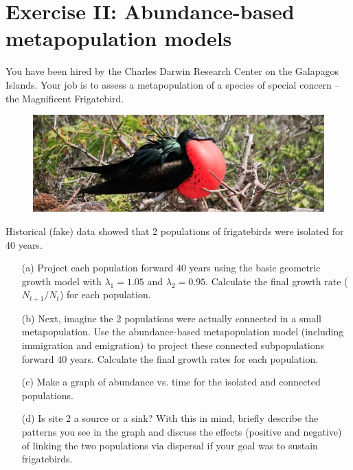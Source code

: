 \documentclass[12pt]{article}\usepackage[]{graphicx}\usepackage[]{xcolor}
\begin{document}
\clearpage


\section*{Exercise II: Abundance-based metapopulation models }
You have been hired by the Charles Darwin Research Center on the
Galapagos Islands. Your job is to assess a metapopulation of a species
of special concern -- the Magnificent Frigatebird.

\begin{figure}[h!]
  \centering
  \includegraphics[width=\textwidth]{figs/frigatebird}
  \label{fig:frig}
\end{figure}

\vspace{-24pt}

Historical (fake) data showed that 2 populations of frigatebirds were
isolated for 40 years.

\begin{enumerate}
  \item[(a)] Project each population forward 40 years using the basic
    geometric growth model with $\lambda_1=1.05$ and
    $\lambda_2=0.95$. Calculate the final growth rate ($N_{t+1}/N_t$)
    for each population.
  \item[(b)] Next, imagine the 2 populations were actually connected
    in a small metapopulation. Use the abundance-based metapopulation
    model (including immigration and emigration) to project these
    connected subpopulations forward 40 years. Calculate the final
    growth rates for each population.
  \item[(c)] Make a graph of abundance vs. time for the isolated and
    connected populations.
  \item[(d)] Is site 2 a source or a sink? With this in mind,
    briefly describe the patterns you see in the graph and discuss the
    effects (positive and negative) of linking the two populations via
    dispersal if your goal was to sustain frigatebirds.
\end{enumerate}
\end{document}
